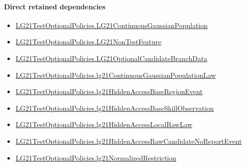 \documentclass[10pt]{article}
\begin{document}
\paragraph{Direct retained dependencies}
\begin{itemize}\raggedright
\item \hyperlink{paper-prerequisite-f5e1c886d250142b}{LG21\allowbreak{}Test\allowbreak{}Optional\allowbreak{}Policies.\allowbreak{}LG21\allowbreak{}Continuous\allowbreak{}Gaussian\allowbreak{}Population}
\item \hyperlink{governing-declaration-81cb73bf3869c56d}{LG21\allowbreak{}Test\allowbreak{}Optional\allowbreak{}Policies.\allowbreak{}LG21\allowbreak{}Non\allowbreak{}Test\allowbreak{}Feature}
\item \hyperlink{governing-declaration-5ca7587508e20c80}{LG21\allowbreak{}Test\allowbreak{}Optional\allowbreak{}Policies.\allowbreak{}LG21\allowbreak{}Optional\allowbreak{}Candidate\allowbreak{}Branch\allowbreak{}Data}
\item \hyperlink{governing-declaration-8fd8cc4e09eeb58a}{LG21\allowbreak{}Test\allowbreak{}Optional\allowbreak{}Policies.\allowbreak{}lg21\allowbreak{}Continuous\allowbreak{}Gaussian\allowbreak{}Population\allowbreak{}Law}
\item \hyperlink{governing-declaration-cecb402908ae7bf6}{LG21\allowbreak{}Test\allowbreak{}Optional\allowbreak{}Policies.\allowbreak{}lg21\allowbreak{}Hidden\allowbreak{}Access\allowbreak{}Base\allowbreak{}Region\allowbreak{}Event}
\item \hyperlink{governing-declaration-88596ee39a94dded}{LG21\allowbreak{}Test\allowbreak{}Optional\allowbreak{}Policies.\allowbreak{}lg21\allowbreak{}Hidden\allowbreak{}Access\allowbreak{}Base\allowbreak{}Skill\allowbreak{}Observation}
\item \hyperlink{governing-declaration-021e105247bd247f}{LG21\allowbreak{}Test\allowbreak{}Optional\allowbreak{}Policies.\allowbreak{}lg21\allowbreak{}Hidden\allowbreak{}Access\allowbreak{}Local\allowbreak{}Raw\allowbreak{}Law}
\item \hyperlink{governing-declaration-c4a1b26beb260711}{LG21\allowbreak{}Test\allowbreak{}Optional\allowbreak{}Policies.\allowbreak{}lg21\allowbreak{}Hidden\allowbreak{}Access\allowbreak{}Raw\allowbreak{}Candidate\allowbreak{}No\allowbreak{}Report\allowbreak{}Event}
\item \hyperlink{governing-declaration-ee825e256b6d452b}{LG21\allowbreak{}Test\allowbreak{}Optional\allowbreak{}Policies.\allowbreak{}lg21\allowbreak{}Normalized\allowbreak{}Restriction}
\end{itemize}
\hypertarget{governing-declaration-dc273b7fe4c2d289}{}
\end{document}
